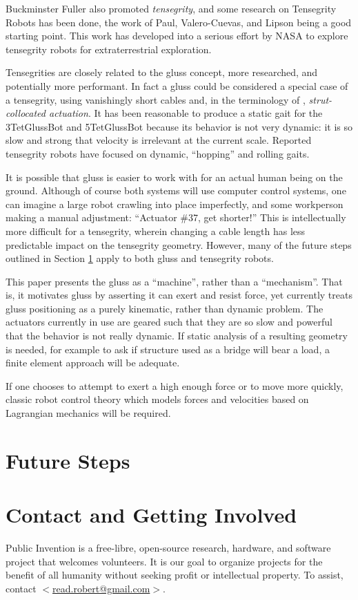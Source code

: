 \documentclass[11pt]{article}
\begin{document}
Buckminster Fuller also promoted \emph{tensegrity}, and some research on Tensegrity Robots has been done, the
work of Paul, Valero-Cuevas, and Lipson\cite{paul2006} being a good starting point.
This work has developed into a serious effort\cite{NTRT} by NASA to explore tensegrity robots for extraterrestrial
exploration.

Tensegrities are closely related to the gluss concept, more researched, and potentially more performant.
In fact a gluss could be considered a special case of a tensegrity, using vanishingly short cables
and, in the terminology of \cite{paul2006}, \emph{strut-collocated actuation}.
It has been reasonable to produce a static gait for the 3TetGlussBot and 5TetGlussBot because its behavior is not
very dynamic: it is so slow and strong that velocity is irrelevant at the current scale.
Reported tensegrity robots have focused on dynamic, ``hopping'' and rolling gaits.

It is possible that gluss is easier to work with for an actual human being on the ground.
Although of course both systems will use computer control systems, one can imagine a large robot
crawling into place imperfectly, and some workperson making a manual adjustment: ``Actuator \#37, get shorter!''
This is intellectually more difficult for a tensegrity, wherein changing a cable length
has less predictable impact on the tensegrity geometry.
However, many
of the future steps outlined in Section \ref{futuresteps} apply to both gluss and tensegrity robots.

This paper presents the gluss as a ``machine'', rather than a ``mechanism''. That is, it motivates gluss
by asserting it can exert and resist force, yet currently treats gluss positioning as a purely kinematic,
rather than dynamic problem. The actuators currently in use are geared such that they are so slow
and powerful that the behavior is not really dynamic. If static analysis of a resulting geometry is
needed, for example to ask if structure used as a bridge will bear a load, a finite element approach\cite{geradin2001flexible}
will be adequate.

If one chooses to attempt to exert a high enough force or to move more quickly, classic robot control theory
which models forces and velocities based on Lagrangian mechanics will be required.


\section{Future Steps}
\label{futuresteps}

\section{Contact and Getting Involved}

Public Invention
is a free-libre, open-source research, hardware, and software project that welcomes volunteers.
It is our goal to organize projects for the benefit of all humanity without seeking profit or intellectual property.
To assist, contact \href{mailto:read.robert@gmail.com}{$<$read.robert@gmail.com$>$}.



\end{document}
